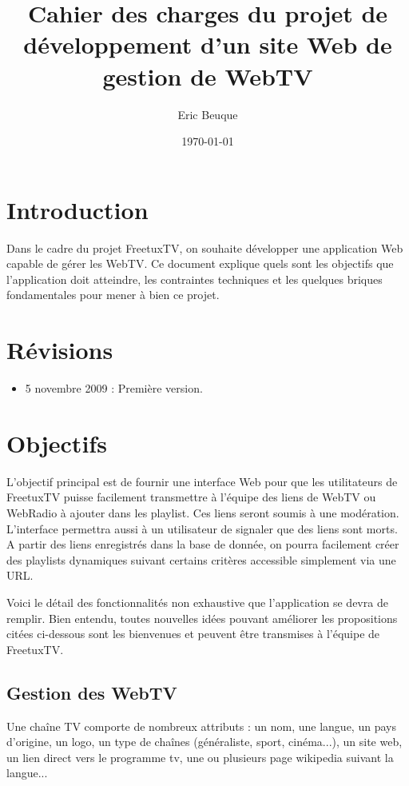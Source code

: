 \documentclass[10pt,a4paper]{article}
\author{Eric Beuque}
\title{Cahier des charges du projet de développement d'un site Web de gestion de WebTV}
\date{\today}
\begin{document}
\maketitle

\section*{Introduction}

Dans le cadre du projet FreetuxTV, on souhaite développer une application Web capable de gérer les WebTV. Ce document explique quels sont les objectifs que l'application doit atteindre, les contraintes techniques et les quelques briques fondamentales pour mener à bien ce projet.

\section*{Révisions}

\begin{itemize}
\item 5 novembre 2009 : Première version.
\end{itemize}

\section{Objectifs}

L'objectif principal est de fournir une interface Web pour que les utilitateurs de FreetuxTV puisse facilement transmettre à l'équipe des liens de WebTV ou WebRadio à ajouter dans les playlist. Ces liens seront soumis à une modération. L'interface permettra aussi à un utilisateur de signaler que des liens sont morts. A partir des liens enregistrés dans la base de donnée, on pourra facilement créer des playlists dynamiques suivant certains critères accessible simplement via une URL.

Voici le détail des fonctionnalités non exhaustive que l'application se devra de remplir. Bien entendu, toutes nouvelles idées pouvant améliorer les propositions citées ci-dessous sont les bienvenues et peuvent être transmises à l'équipe de FreetuxTV.

\subsection{Gestion des WebTV}

Une chaîne TV comporte de nombreux attributs : un nom, une langue, un pays d'origine, un logo, un type de chaînes (généraliste, sport, cinéma...), un site web, un lien direct vers le programme tv, une ou plusieurs page wikipedia suivant la langue...
\end{document}
